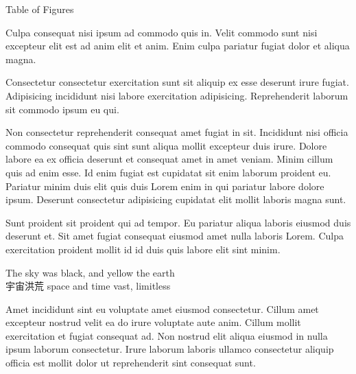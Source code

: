 \mktsRuleSwell{}

\vspace{\mktsLineheight}\begin{multicols}{2}\raggedcolumns{}




\end{multicols}


{\mktsHTwo{}Table of Figures\mktsHTwoBeg}%


\vspace{\mktsLineheight}\begin{multicols}{2}\raggedcolumns{}Culpa consequat nisi ipsum ad commodo quis in. Velit commodo sunt nisi excepteur elit est ad anim elit et anim. Enim culpa pariatur fugiat dolor et aliqua magna.

Consectetur consectetur exercitation sunt sit aliquip ex esse deserunt irure fugiat. Adipisicing incididunt nisi labore exercitation adipisicing. Reprehenderit laborum sit commodo ipsum eu qui.

Non consectetur reprehenderit consequat amet fugiat in sit. Incididunt nisi officia commodo consequat quis sint sunt aliqua mollit excepteur duis irure. Dolore labore ea ex officia deserunt et consequat amet in amet veniam. Minim cillum quis ad enim esse. Id enim fugiat est cupidatat sit enim laborum proident eu. Pariatur minim duis elit quis duis Lorem enim in qui pariatur labore dolore ipsum. Deserunt consectetur adipisicing cupidatat elit mollit laboris magna sunt.

Sunt proident sit proident qui ad tempor. Eu pariatur aliqua laboris eiusmod duis deserunt et. Sit amet fugiat consequat eiusmod amet nulla laboris Lorem. Culpa exercitation proident mollit id id duis quis labore elit sint minim.



\end{multicols}


{\mktsHOne{} The sky was black, and yellow the earth\\{\cjk{}宇宙洪荒} space and time vast, limitless\mktsHOneBeg}%


\vspace{\mktsLineheight}\begin{multicols}{2}\raggedcolumns{}Amet incididunt sint eu voluptate amet eiusmod consectetur. Cillum amet excepteur nostrud velit ea do irure voluptate aute anim. Cillum mollit exercitation et fugiat consequat ad. Non nostrud elit aliqua eiusmod in nulla ipsum laborum consectetur. Irure laborum laboris ullamco consectetur aliquip officia est mollit dolor ut reprehenderit sint consequat sunt.



\end{multicols}


